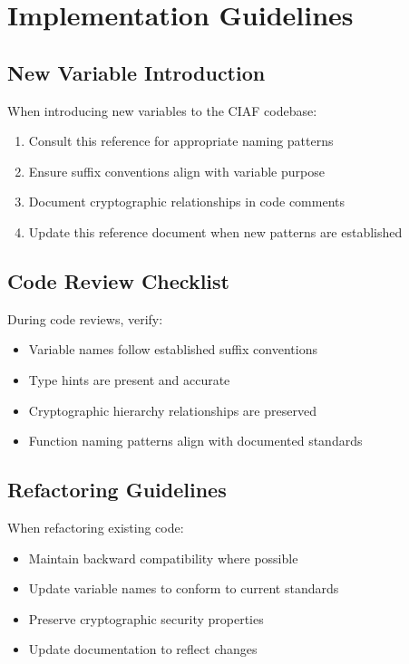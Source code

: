 \documentclass[12pt,a4paper]{article}
\begin{document}
\section{Implementation Guidelines}

\subsection{New Variable Introduction}

When introducing new variables to the CIAF codebase:

\begin{enumerate}
\item Consult this reference for appropriate naming patterns
\item Ensure suffix conventions align with variable purpose
\item Document cryptographic relationships in code comments
\item Update this reference document when new patterns are established
\end{enumerate}

\subsection{Code Review Checklist}

During code reviews, verify:

\begin{itemize}
\item Variable names follow established suffix conventions
\item Type hints are present and accurate
\item Cryptographic hierarchy relationships are preserved
\item Function naming patterns align with documented standards
\end{itemize}

\subsection{Refactoring Guidelines}

When refactoring existing code:

\begin{itemize}
\item Maintain backward compatibility where possible
\item Update variable names to conform to current standards
\item Preserve cryptographic security properties
\item Update documentation to reflect changes
\end{itemize}
\end{document}
